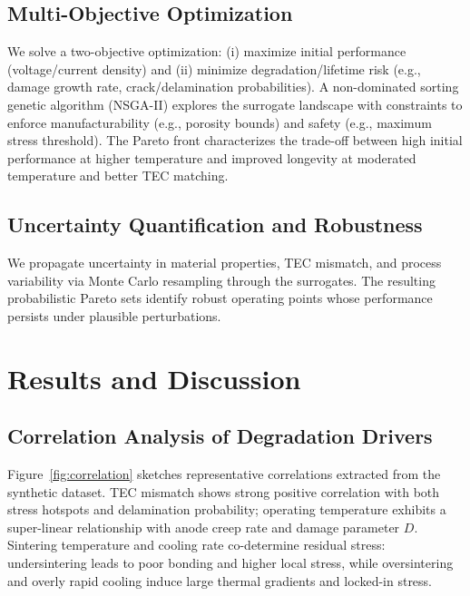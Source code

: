 \documentclass[conference]{IEEEtran}
\begin{document}
\subsection{Multi-Objective Optimization}
We solve a two-objective optimization: (i) maximize initial performance (voltage/current density) and (ii) minimize degradation/lifetime risk (e.g., damage growth rate, crack/delamination probabilities). A non-dominated sorting genetic algorithm (NSGA-II) explores the surrogate landscape with constraints to enforce manufacturability (e.g., porosity bounds) and safety (e.g., maximum stress threshold). The Pareto front characterizes the trade-off between high initial performance at higher temperature and improved longevity at moderated temperature and better TEC matching.

\subsection{Uncertainty Quantification and Robustness}
We propagate uncertainty in material properties, TEC mismatch, and process variability via Monte Carlo resampling through the surrogates. The resulting probabilistic Pareto sets identify robust operating points whose performance persists under plausible perturbations.

\section{Results and Discussion} \label{sec:results}
\subsection{Correlation Analysis of Degradation Drivers}
Figure~\ref{fig:correlation} sketches representative correlations extracted from the synthetic dataset. TEC mismatch shows strong positive correlation with both stress hotspots and delamination probability; operating temperature exhibits a super-linear relationship with anode creep rate and damage parameter $D$. Sintering temperature and cooling rate co-determine residual stress: undersintering leads to poor bonding and higher local stress, while oversintering and overly rapid cooling induce large thermal gradients and locked-in stress.
\end{document}
